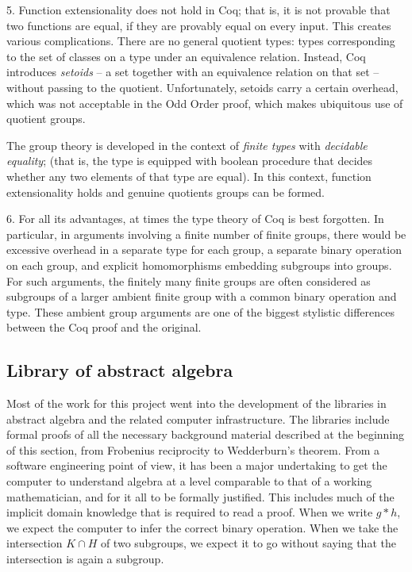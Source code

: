 \documentclass[brochure,english,12pt]{bourbaki}
\theoremstyle{plain}
\begin{document}
5.  Function extensionality does not hold in Coq; that is, it is not
provable that two functions are equal, if they are provably equal on
every input.  This creates various complications.  There are no
general quotient types: types corresponding to the set of classes on a
type under an equivalence relation.  Instead, Coq introduces {\it
  setoids} -- a set together with an equivalence relation on that set
-- without passing to the quotient.  Unfortunately, setoids carry a
certain overhead, which was not acceptable in the Odd Order proof,
which makes ubiquitous use of quotient groups.

The group theory is developed in the context of {\it finite types}
with {\it decidable equality}; (that is, the type is equipped with
boolean procedure that decides whether any two elements of that type
are equal).  In this context, function extensionality holds and
genuine quotients groups can be formed.

6.  For all its advantages, at times the type theory of Coq is best
forgotten.  In particular, in arguments involving a finite number of
finite groups, there would be excessive overhead in a separate type
for each group, a separate binary operation on each group, and
explicit homomorphisms embedding subgroups into groups.  For such
arguments, the finitely many finite groups are often considered as
subgroups of a larger ambient finite group with a common binary
operation and type.  These ambient group arguments are one of the
biggest stylistic differences between the Coq proof and the original.


\subsection{Library of abstract algebra}

Most of the work for this project went into the development of the
libraries in abstract algebra and the related computer infrastructure.
The libraries include formal proofs of all the necessary background
material described at the beginning of this section, from Frobenius
reciprocity to Wedderburn's theorem.  From a software engineering
point of view, it has been a major undertaking to get the computer to
understand algebra at a level comparable to that of a working
mathematician, and for it all to be formally justified.  This includes
much of the implicit domain knowledge that is required to read a
proof.  When we write $g*h$, we expect the computer to infer the
correct binary operation.  When we take the intersection $K\cap H$ of
two subgroups, we expect it to go without saying that the intersection
is again a subgroup.
\end{document}
